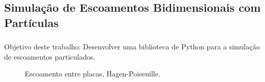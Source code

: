 \documentclass{beamer}
\begin{document}
\subsection{Simulação de Escoamentos Bidimensionais com Partículas} %
\begin{frame}
  \frametitle{\subsecname}
  
  \begin{block}{Objetivo deste trabalho:}
    Desenvolver uma biblioteca de Python para a simulação de escoamentos particulados.
  \end{block}
  
  \begin{figure}
     {\raggedleft \tiny Escoamento entre placas, Hagen-Poiseuille.}
  \end{figure}

\end{frame}
\end{document}
